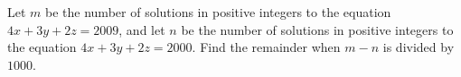 Let $ m$ be the number of solutions in positive integers to the equation $ 4x+3y+2z=2009$, and let $ n$ be the number of solutions in positive integers to the equation $ 4x+3y+2z=2000$. Find the remainder when $ m-n$ is divided by $ 1000$.